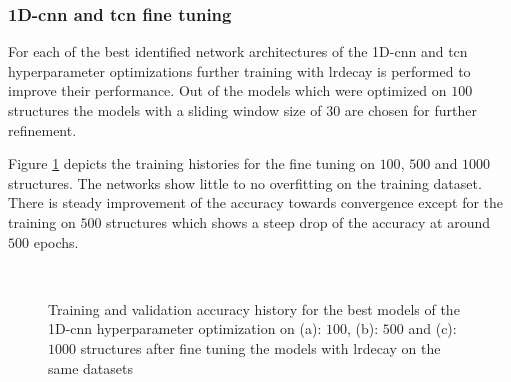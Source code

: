 \documentclass[conference]{IEEEtran}
\begin{document}
\subsubsection{1D-\gls{cnn} and \gls{tcn} fine tuning}
\label{sec:cnn_fine_tuning_results}

For each of the best identified network architectures of the 1D-\gls{cnn} and \gls{tcn} hyperparameter optimizations further training with \gls{lrdecay} is performed to improve their performance. Out of the models which were optimized on $ 100 $ structures the models with a sliding window size of $ 30 $ are chosen for further refinement.

Figure \ref{fig:accuracy_adaptiveLR_CNN} depicts the training histories for the fine tuning on $ 100 $, $ 500 $ and $ 1000 $ structures. The networks show little to no overfitting on the training dataset. There is steady improvement of the accuracy towards convergence except for the training on $ 500 $ structures which shows a steep drop of the accuracy at around $ 500 $ epochs.

\begin{figure}[htp]
	\centering
	\quad
	\\
	\caption{Training and validation accuracy history for the best models of the 1D-\gls{cnn} hyperparameter optimization on (a): $ 100 $, (b): $ 500 $ and (c): $ 1000 $ structures after fine tuning the models with \gls{lrdecay} on the same datasets}
	\label{fig:accuracy_adaptiveLR_CNN}
\end{figure}
\end{document}
